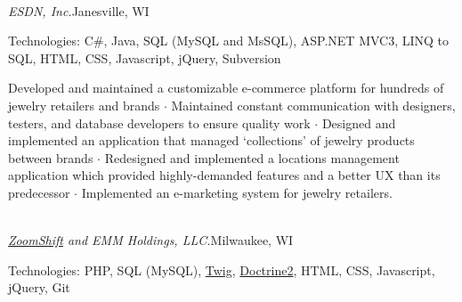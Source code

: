 \documentclass[11pt]{article}
\newcommand{\marginhead}[1]{\marginpar{\textsf{{\footnotesize\flushright #1}}}}
\newcommand{\smaller}{\fontsize{9}{11}\selectfont}
\begin{document}

\marginhead{{\vskip -1.35em}\hfill Career History}


 \\ {\it ESDN, Inc.}\hfill Janesville, WI

\begin{description}
	\setlength{\itemsep}{2pt}\small\begin{spacing}{1}
	
	\item[\smaller Technologies:] {\small C\#, Java, SQL (MySQL and MsSQL), ASP.NET MVC3, LINQ to SQL, HTML, CSS, Javascript, jQuery, Subversion}
	
	\end{spacing}
\end{description}

\vspace{-.25cm}

\noindent        Developed and maintained a customizable e-commerce platform for hundreds of jewelry retailers and brands
{\large $\cdot$} Maintained constant communication with designers, testers, and database developers to ensure quality work
{\large $\cdot$} Designed and implemented an application that managed `collections' of jewelry products between brands
{\large $\cdot$} Redesigned and implemented a locations management application which provided highly-demanded features and a better UX than its predecessor
{\large $\cdot$} Implemented an e-marketing system for jewelry retailers.

\bigskip


\newpage

 \\ {\it \href{http://www.zoomshift.com/}{ZoomShift} and EMM Holdings, LLC.}\hfill Milwaukee, WI

\begin{description}
	\setlength{\itemsep}{2pt}\small\begin{spacing}{1}
	
	\item[\smaller Technologies:] {\small PHP, SQL (MySQL), \href{http://twig.sensiolabs.org/}{Twig}, \href{http://www.doctrine-project.org/}{Doctrine2}, HTML, CSS, Javascript, jQuery, Git}
	
	\end{spacing}
\end{description}
\end{document}
